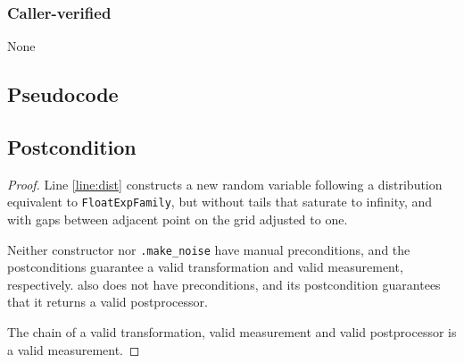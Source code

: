 \documentclass{article}
\begin{document}
\subsubsection*{Caller-verified}
None

\subsection*{Pseudocode}


\subsection*{Postcondition}
\begin{theorem}
\end{theorem}

\begin{proof}
    Line \ref{line:dist} constructs a new random variable following a distribution equivalent to \texttt{FloatExpFamily},
    but without tails that saturate to infinity, and with gaps between adjacent point on the grid adjusted to one.

    Neither constructor  nor
    \texttt{.make\_noise} have manual preconditions,
    and the postconditions guarantee a valid transformation and valid measurement, respectively.
     also does not have preconditions,
    and its postcondition guarantees that it returns a valid postprocessor.

    The chain of a valid transformation, valid measurement and valid postprocessor is a valid measurement.
\end{proof}
\end{document}
